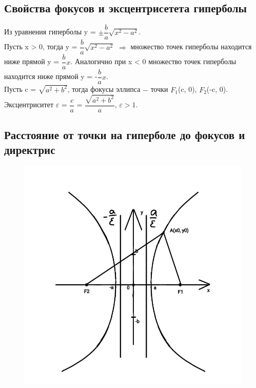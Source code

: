 \subsection{Свойства фокусов и эксцентрисетета гиперболы}

Из уравнения гиперболы y = $\pm\dfrac{b}{a}\sqrt{x^2 - a^2}$.\\

Пусть x > 0, тогда y = $\dfrac{b}{a}\sqrt{x^2 - a^2}$ $\Longrightarrow$ множество точек гиперболы находится ниже прямой y = $\dfrac{b}{a}x$. Аналогично при x < 0 множество точек гиперболы находится ниже прямой y = -$\dfrac{b}{a}x$.\\

Пусть c = $\sqrt{a^2 + b^2}$, тогда фокусы эллипса $-$ точки $F_1$(c, 0), $F_2$(-c, 0).\\
    
Эксцентриситет $\varepsilon$ = $\dfrac{c}{a}$ = $\dfrac{\sqrt{a^2 + b^2}}{a}$, $\varepsilon > 1$.\\

\subsection{Расстояние от точки на гиперболе до фокусов и директрис}

\begin{figure}
    \includegraphics[width=0.8\linewidth]{images/гипербола2.jpeg}
\end{figure}

\tab\\

